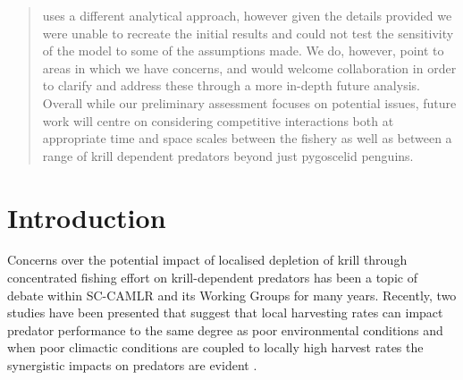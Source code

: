 \documentclass[]{elsarticle} %
\begin{document}
\begin{frontmatter}
\begin{abstract}
  \citet{Kruger2021} uses a different analytical approach, however given
  the details provided we were unable to recreate the initial results
  and could not test the sensitivity of the model to some of the
  assumptions made. We do, however, point to areas in which we have
  concerns, and would welcome collaboration in order to clarify and
  address these through a more in-depth future analysis. Overall while
  our preliminary assessment focuses on potential issues, future work
  will centre on considering competitive interactions both at
  appropriate time and space scales between the fishery as well as
  between a range of krill dependent predators beyond just pygoscelid
  penguins.
  \end{abstract}
  
 \end{frontmatter}

\section{Introduction}\label{introduction}

Concerns over the potential impact of localised depletion of krill
through concentrated fishing effort on krill-dependent predators has
been a topic of debate within SC-CAMLR and its Working Groups for many
years. Recently, two studies have been presented that suggest that local
harvesting rates can impact predator performance to the same degree as
poor environmental conditions \citep{Watters2020} and when poor
climactic conditions are coupled to locally high harvest rates the
synergistic impacts on predators are evident \citep{Kruger2021}.
\end{document}
